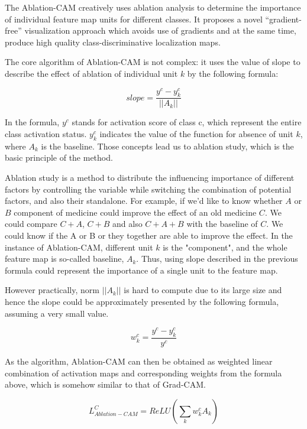 \documentclass[conference]{IEEEtran}
\begin{document}
The Ablation-CAM creatively uses ablation analysis to determine the importance of individual feature map units for different classes. It proposes a novel “gradient-free” visualization approach which avoids use of gradients and at the same time, produce high quality class-discriminative localization maps.\par

The core algorithm of Ablation-CAM is not complex: it uses the value of slope to describe the effect of ablation of individual unit $k$ by the following formula:

$$slope = \frac{y^c-y^c_k}{||A_k||}$$

In the formula, $y^c$ stands for activation score of class c, which represent the entire class activation status. $y^c_k$ indicates the value of the function for absence of unit $k$, where $A_k$ is the baseline. Those concepts lead us to ablation study, which is the basic principle of the method.\par
Ablation study is a method to distribute the influencing importance of different factors by controlling the variable while switching the combination of potential factors, and also their standalone. For example, if we'd like to know whether $A$ or $B$ component of medicine could improve the effect of an old medicine $C$. We could compare $C+A$, $C+B$ and also $C+A+B$ with the baseline of $C$. We could know if the A or B or they together are able to improve the effect. In the instance of Ablation-CAM, different unit $k$ is the "component", and the whole feature map is so-called baseline, $A_k$. Thus, using slope described in the previous formula could represent the importance of a single unit to the feature map.\par
However practically, norm $||A_k||$ is hard to compute due to its large size and hence the slope could be approximately presented by the following formula, assuming a very small value.

$$w^c_k = \frac{y^c-y^c_k}{y^c}$$

As the algorithm, Ablation-CAM can then be obtained as weighted linear combination of activation maps and corresponding weights from the formula above, which is somehow similar to that of Grad-CAM.

$$L^C_{Ablation-CAM}=ReLU(\sum_k {w^c_k}{A_k})$$
\end{document}
